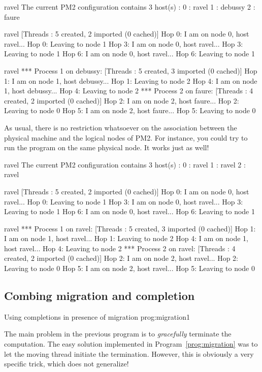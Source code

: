 \begin{shell}
ravel%
The current PM2 configuration contains 3 host(s) :
0 : ravel
1 : debussy
2 : faure

ravel%
[Threads : 5 created, 2 imported (0 cached)]
Hop 0: I am on node 0, host ravel...
Hop 0: Leaving to node 1
Hop 3: I am on node 0, host ravel...
Hop 3: Leaving to node 1
Hop 6: I am on node 0, host ravel...
Hop 6: Leaving to node 1

ravel%
*** Process 1 on debussy:
[Threads : 5 created, 3 imported (0 cached)]
Hop 1: I am on node 1, host debussy...
Hop 1: Leaving to node 2
Hop 4: I am on node 1, host debussy...
Hop 4: Leaving to node 2
*** Process 2 on faure:
[Threads : 4 created, 2 imported (0 cached)]
Hop 2: I am on node 2, host faure...
Hop 2: Leaving to node 0
Hop 5: I am on node 2, host faure...
Hop 5: Leaving to node 0
\end{shell}
As usual, there is no restriction whatsoever on the association
between the physical machine and the logical nodes of PM2. For
instance, you could try to run the program on the same physical node.
It works just as well!
\begin{shell}
ravel%
The current PM2 configuration contains 3 host(s) :
0 : ravel
1 : ravel
2 : ravel

ravel%
[Threads : 5 created, 2 imported (0 cached)]
Hop 0: I am on node 0, host ravel...
Hop 0: Leaving to node 1
Hop 3: I am on node 0, host ravel...
Hop 3: Leaving to node 1
Hop 6: I am on node 0, host ravel...
Hop 6: Leaving to node 1

ravel%
*** Process 1 on ravel:
[Threads : 5 created, 3 imported (0 cached)]
Hop 1: I am on node 1, host ravel...
Hop 1: Leaving to node 2
Hop 4: I am on node 1, host ravel...
Hop 4: Leaving to node 2
*** Process 2 on ravel:
[Threads : 4 created, 2 imported (0 cached)]
Hop 2: I am on node 2, host ravel...
Hop 2: Leaving to node 0
Hop 5: I am on node 2, host ravel...
Hop 5: Leaving to node 0
\end{shell}

\subsection{Combing migration and completion}

 {Using completions in presence of
  migration} {prog:migration1}

The main problem in the previous program is to \emph{gracefully} terminate
the computation. The easy solution implemented in
Program~\ref{prog:migration} was to let the moving thread initiate the
termination. However, this is obviously a very specific trick, which
does not generalize!

